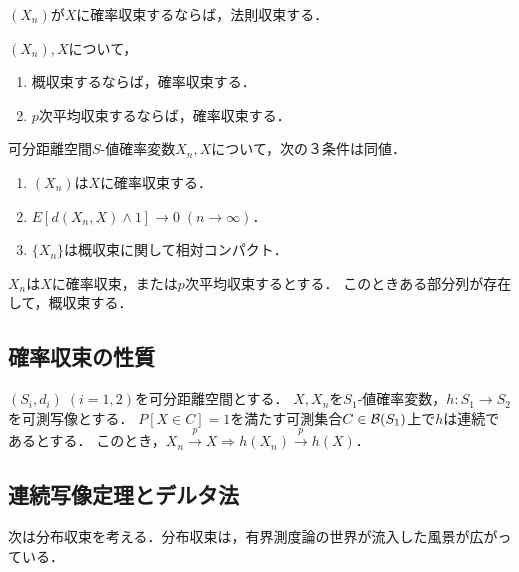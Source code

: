 \documentclass[uplatex,dvipdfmx]{jsreport}
\begin{document}
\begin{lemma}[相互関係1]
    $(X_n)$が$X$に確率収束するならば，法則収束する．
\end{lemma}

\begin{theorem}[相互関係2]
    $(X_n),X$について，
    \begin{enumerate}
        \item 概収束するならば，確率収束する．
        \item $p$次平均収束するならば，確率収束する．
    \end{enumerate}
\end{theorem}

\begin{proposition}[確率収束の特徴付け]
    可分距離空間$S$-値確率変数$X_n,X$について，次の３条件は同値．
    \begin{enumerate}
        \item $(X_n)$は$X$に確率収束する．
        \item $E[d(X_n,X)\land 1]\to 0\;(n\to\infty)$．
        \item $\{X_n\}$は概収束に関して相対コンパクト．
    \end{enumerate}
\end{proposition}

\begin{corollary}[弱めた逆が成り立つ]
    $X_n$は$X$に確率収束，または$p$次平均収束するとする．
    このときある部分列が存在して，概収束する．
\end{corollary}

\subsection{確率収束の性質}

\begin{proposition}
    $(S_i,d_i)\;(i=1,2)$を可分距離空間とする．
    $X,X_n$を$S_1$-値確率変数，$h:S_1\to S_2$を可測写像とする．
    $P[X\in C]=1$を満たす可測集合$C\in\mathcal{B}(S_1)$上で$h$は連続であるとする．
    このとき，$X_n\xrightarrow{p}X\Rightarrow h(X_n)\xrightarrow{p}h(X)$．
\end{proposition}

\subsection{連続写像定理とデルタ法}

\begin{tcolorbox}[colframe=ForestGreen, colback=ForestGreen!10!white,breakable,colbacktitle=ForestGreen!40!white,coltitle=black,fonttitle=\bfseries\sffamily,
title=]
    次は分布収束を考える．分布収束は，有界測度論の世界が流入した風景が広がっている．
\end{tcolorbox}
\end{document}
